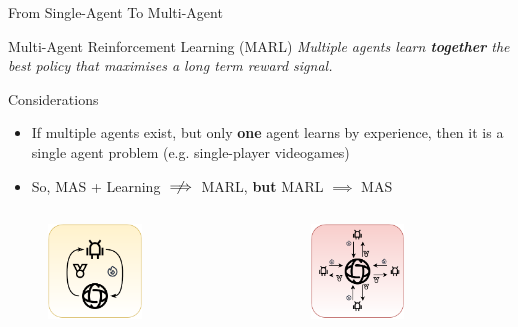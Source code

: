 \documentclass[presentation]{beamer}\mode<presentation>{\usetheme{AMSBolognaFC}}
\begin{document}
\begin{frame}[c]{From Single-Agent To Multi-Agent}
	\begin{alertblock}{Multi-Agent Reinforcement Learning (MARL)}
		\centering
		\emph{Multiple agents learn \textbf{together} the best policy that maximises
	a long term reward signal.}
	\end{alertblock}
	\begin{exampleblock}{Considerations}
		\begin{itemize}
			\item If multiple agents exist, but only \textbf{one} agent learns by experience, then it is a single agent problem (e.g. single-player videogames)
			\item So, MAS + Learning $\centernot\implies$ MARL, \textbf{but} MARL $\implies$ MAS
		\end{itemize}
	\end{exampleblock}
	\begin{columns}
		\begin{column}{0.4\textwidth}
			\raggedleft
			\begin{figure}
				\includegraphics[height=2.5cm]{img/single-agent-multi-agent-1.pdf}
			\end{figure}
		\end{column}
		\begin{column}{0.4\textwidth}	
			\raggedright
			\begin{figure}
				\includegraphics[height=2.5cm]{img/single-agent-multi-agent-2.pdf}
			\end{figure}
		\end{column}
	\end{columns}
\end{frame}
\end{document}
